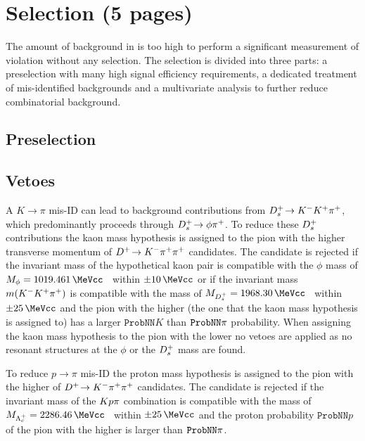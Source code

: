 
\section{Selection (5 pages)}
\label{sec:b02dd:selection}

The amount of background in \BdToDD is too high to perform a significant
measurement of \CP violation without any selection. The selection is divided
into three parts: a preselection with many high signal efficiency
requirements, a dedicated treatment of mis-identified backgrounds and a
multivariate analysis to further reduce combinatorial background.

\subsection{Preselection}
\label{sec:b02dd:selection:cuts}


\subsection{Vetoes}
\label{sec:b02dd:selection:vetoes}

A $K\rightarrow\pi$ mis-ID can lead to background contributions from
${{D}^+_{s}}\!\rightarrow {\ensuremath{{K}^-}}{\ensuremath{{K}^+}}{\ensuremath{{\pi}^+}}$, which predominantly proceeds through ${{D}^+_{s}}\!\rightarrow \phi{\ensuremath{{\pi}^+}}$. To reduce
these ${{D}^+_{s}}$ contributions the kaon mass hypothesis is assigned to the pion
with the higher transverse momentum of ${{D}^+}\!\rightarrow {\ensuremath{{K}^-}}{\ensuremath{{\pi}^+}}{\ensuremath{{\pi}^+}}$ candidates. The candidate
is rejected if the invariant mass of the hypothetical kaon pair is compatible
with the $\phi$ mass of $M_{\phi} = \SI{1019.461}{\MeVcc}$~\cite{PDG2014}
within $\pm\SI{10}{\MeVcc}$ or if the invariant mass $m({{K}^-}{{K}^+}{{\pi}^+})$ is
compatible with the \Dsp mass of $M_{\Dsp} =
\SI{1968.30}{\MeVcc}$~\cite{PDG2014} within $\pm\SI{25}{\MeVcc}$ and the pion
with the higher \pT (the one that the kaon mass hypothesis is assigned to) has
a larger $\texttt{ProbNN}K$ than $\texttt{ProbNN}{\ensuremath{\pi}}$ probability. When
assigning the kaon mass hypothesis to the pion with the lower \pT no vetoes
are applied as no resonant structures at the $\phi$ or the ${{D}^+_{s}}$ mass are
found.

To reduce $p\rightarrow\pi$ mis-ID the proton mass hypothesis is assigned to
the pion with the higher \pT of ${{D}^+}\!\rightarrow {\ensuremath{{K}^-}}{\ensuremath{{\pi}^+}}{\ensuremath{{\pi}^+}}$ candidates. The candidate is
rejected if the invariant mass of the ${K}{p}{\pi}$ combination is
compatible with the \Lc mass of $M_{\Lc} =
\SI{2286.46}{\MeVcc}$~\cite{PDG2014} within $\pm\SI{25}{\MeVcc}$ and the
proton probability $\texttt{ProbNN}p$ of the pion with the higher \pT is
larger than $\texttt{ProbNN}{\ensuremath{\pi}}$.

